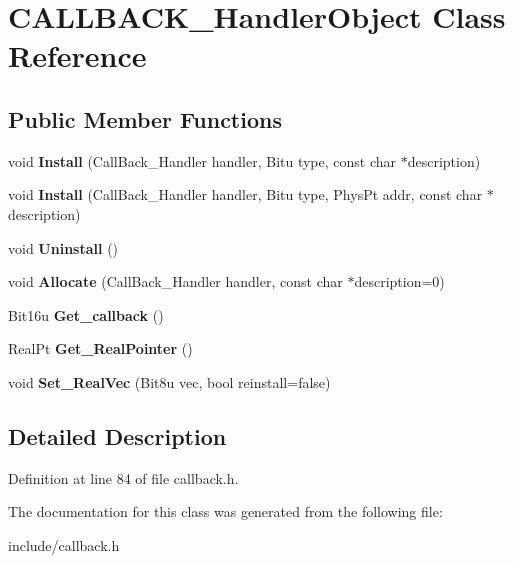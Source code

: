 \hypertarget{classCALLBACK__HandlerObject}{\section{C\-A\-L\-L\-B\-A\-C\-K\-\_\-\-Handler\-Object Class Reference}
\label{classCALLBACK__HandlerObject}
}
\subsection*{Public Member Functions}
\begin{DoxyCompactItemize}
\item 
\hypertarget{classCALLBACK__HandlerObject_af226371a5aa8f9b18d8ffd5fdec5e839}{void {\bfseries Install} (Call\-Back\-\_\-\-Handler handler, Bitu type, const char $\ast$description)}\label{classCALLBACK__HandlerObject_af226371a5aa8f9b18d8ffd5fdec5e839}

\item 
\hypertarget{classCALLBACK__HandlerObject_a3ed2e7ffbce75489eab79c5e3a4903c1}{void {\bfseries Install} (Call\-Back\-\_\-\-Handler handler, Bitu type, Phys\-Pt addr, const char $\ast$description)}\label{classCALLBACK__HandlerObject_a3ed2e7ffbce75489eab79c5e3a4903c1}

\item 
\hypertarget{classCALLBACK__HandlerObject_a7155b838519155e526839d960c2ab984}{void {\bfseries Uninstall} ()}\label{classCALLBACK__HandlerObject_a7155b838519155e526839d960c2ab984}

\item 
\hypertarget{classCALLBACK__HandlerObject_ac8b4fa624c28592a6b9b89a31c1d4589}{void {\bfseries Allocate} (Call\-Back\-\_\-\-Handler handler, const char $\ast$description=0)}\label{classCALLBACK__HandlerObject_ac8b4fa624c28592a6b9b89a31c1d4589}

\item 
\hypertarget{classCALLBACK__HandlerObject_a88c44d8f9d2c06850e7a1e529654df73}{Bit16u {\bfseries Get\-\_\-callback} ()}\label{classCALLBACK__HandlerObject_a88c44d8f9d2c06850e7a1e529654df73}

\item 
\hypertarget{classCALLBACK__HandlerObject_a6a9275192b60c2968f2525755c916fac}{Real\-Pt {\bfseries Get\-\_\-\-Real\-Pointer} ()}\label{classCALLBACK__HandlerObject_a6a9275192b60c2968f2525755c916fac}

\item 
\hypertarget{classCALLBACK__HandlerObject_a4f0eaae05d1bce0df9c0b9dfd2b8fcdc}{void {\bfseries Set\-\_\-\-Real\-Vec} (Bit8u vec, bool reinstall=false)}\label{classCALLBACK__HandlerObject_a4f0eaae05d1bce0df9c0b9dfd2b8fcdc}

\end{DoxyCompactItemize}


\subsection{Detailed Description}


Definition at line 84 of file callback.\-h.



The documentation for this class was generated from the following file\-:\begin{DoxyCompactItemize}
\item 
include/callback.\-h\end{DoxyCompactItemize}
